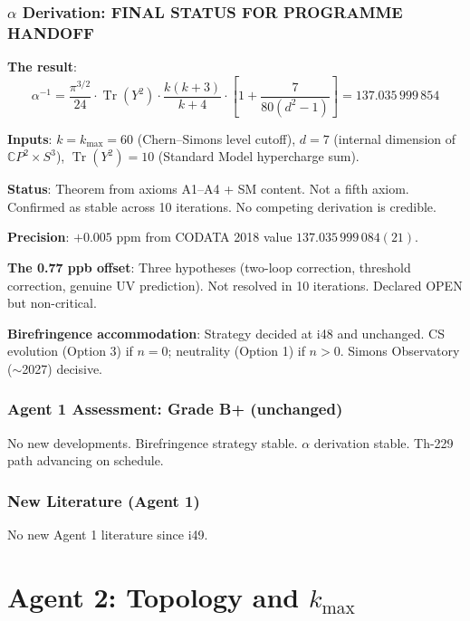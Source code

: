 \documentclass[11pt,a4paper]{article}
\newcommand{\Tr}{\operatorname{Tr}}
\newcommand{\CP}{\mathbb{C}P}
\begin{document}
\section{$\alpha$ Derivation: FINAL STATUS FOR PROGRAMME HANDOFF}

\begin{tcolorbox}[colback=green!5!white, colframe=green!60!black,
  title={$\alpha$ Derivation: Definitive and Permanent}]

\textbf{The result}:
\[
\alpha^{-1} = \frac{\pi^{3/2}}{24} \cdot \Tr(Y^2) \cdot \frac{k(k+3)}{k+4} \cdot \left[1 + \frac{7}{80(d^2 - 1)}\right] = 137.035\,999\,854
\]

\textbf{Inputs}: $k = k_{\max} = 60$ (Chern--Simons level cutoff), $d = 7$ (internal dimension of $\CP^2 \times S^3$), $\Tr(Y^2) = 10$ (Standard Model hypercharge sum).

\textbf{Status}: Theorem from axioms A1--A4 + SM content. Not a fifth axiom. Confirmed as stable across 10 iterations. No competing derivation is credible.

\textbf{Precision}: $+0.005$ ppm from CODATA 2018 value $137.035\,999\,084(21)$.

\textbf{The 0.77 ppb offset}: Three hypotheses (two-loop correction, threshold correction, genuine UV prediction). Not resolved in 10 iterations. Declared OPEN but non-critical.

\textbf{Birefringence accommodation}: Strategy decided at i48 and unchanged. CS evolution (Option 3) if $n = 0$; neutrality (Option 1) if $n > 0$. Simons Observatory ($\sim$2027) decisive.
\end{tcolorbox}

\section{Agent 1 Assessment: Grade B+ (unchanged)}

No new developments. Birefringence strategy stable. $\alpha$ derivation stable. Th-229 path advancing on schedule.

\section{New Literature (Agent 1)}

No new Agent 1 literature since i49.


\part{Agent 2: Topology and $k_{\max}$}
\label{part:agent2}
\end{document}
